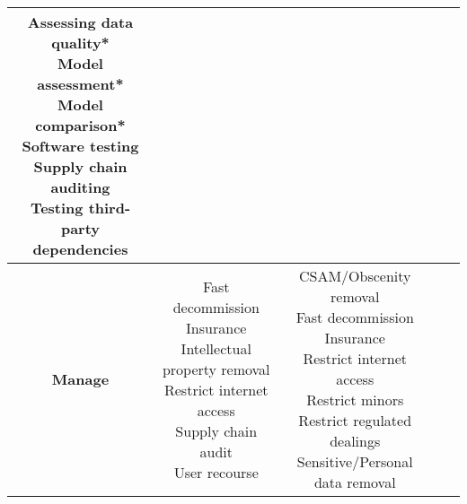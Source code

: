 \documentclass[fleqn]{article}
\begin{document}
\begin{landscape}
\begin{table}[H]
\begin{tabular}{|c|c|c|c|c|}
{			\textbullet\hspace{3pt} Assessing data quality*\\ 
			\textbullet\hspace{3pt} Model assessment*\\ 
			\textbullet\hspace{3pt} Model comparison*\\ 
			\textbullet\hspace{3pt} Software testing \\ 
			\textbullet\hspace{3pt} Supply chain auditing \\ 
			\textbullet\hspace{3pt} Testing third-party dependencies \\
		}
		\\
		\hline
		\textbf{Manage} 
		& \makecell[l]{
			\textbullet\hspace{3pt} Fast decommission \\ 	
			\textbullet\hspace{3pt} Insurance \\ 	
			\textbullet\hspace{3pt} Intellectual property removal \\ 	
			\textbullet\hspace{3pt} Restrict internet access \\ 		
			\textbullet\hspace{3pt} Supply chain audit \\ 	
			\textbullet\hspace{3pt} User recourse \\ 					 	 
		} 
		& \makecell[l]{
			\textbullet\hspace{3pt} CSAM/Obscenity removal \\ 	
			\textbullet\hspace{3pt} Fast decommission \\ 	
			\textbullet\hspace{3pt} Insurance \\ 	
			\textbullet\hspace{3pt} Restrict internet access \\ 	
			\textbullet\hspace{3pt} Restrict minors \\ 	
			\textbullet\hspace{3pt} Restrict regulated dealings \\ 	
			\textbullet\hspace{3pt} Sensitive/Personal data removal \\ 	
}
\end{tabular}
\end{table}
\end{landscape}
\end{document}
